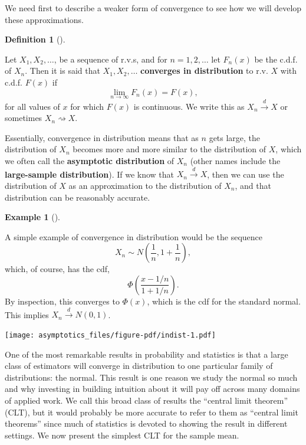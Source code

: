 \documentclass[
  13pt,
  letterpaper,
  DIV=11,
  numbers=noendperiod]{scrreprt}
\newcommand{\indist}{\overset{d}{\to}}
\theoremstyle{plain}
\theoremstyle{definition}
\newtheorem{example}{Example}[chapter]
\theoremstyle{definition}
\newtheorem{definition}{Definition}[chapter]
\theoremstyle{remark}
\begin{document}
We need first to describe a weaker form of convergence to see how we
will develop these approximations.

\begin{definition}[]\protect\hypertarget{def-indist}{}\label{def-indist}

Let \(X_1,X_2,\ldots\), be a sequence of r.v.s, and for
\(n = 1,2, \ldots\) let \(F_n(x)\) be the c.d.f. of \(X_n\). Then it is
said that \(X_1, X_2, \ldots\) \textbf{converges in distribution} to
r.v. \(X\) with c.d.f. \(F(x)\) if \[
\lim_{n\rightarrow \infty} F_n(x) = F(x),
\] for all values of \(x\) for which \(F(x)\) is continuous. We write
this as \(X_n \indist X\) or sometimes \(X_n ⇝ X\).

\end{definition}

Essentially, convergence in distribution means that as \(n\) gets large,
the distribution of \(X_n\) becomes more and more similar to the
distribution of \(X\), which we often call the \textbf{asymptotic
distribution} of \(X_n\) (other names include the \textbf{large-sample
distribution}). If we know that \(X_n \indist X\), then we can use the
distribution of \(X\) as an approximation to the distribution of
\(X_n\), and that distribution can be reasonably accurate.

\begin{example}[]\protect\hypertarget{exm-indist}{}\label{exm-indist}

A simple example of convergence in distribution would be the sequence \[
X_n \sim N\left(\frac{1}{n}, 1 + \frac{1}{n}\right),
\] which, of course, has the cdf, \[
\Phi\left(\frac{x - 1/n}{1+1/n}\right).
\] By inspection, this converges to \(\Phi(x)\), which is the cdf for
the standard normal. This implies \(X_n \indist N(0, 1)\).

\texttt{[image: asymptotics\_files/figure-pdf/indist-1.pdf]}

\end{example}

One of the most remarkable results in probability and statistics is that
a large class of estimators will converge in distribution to one
particular family of distributions: the normal. This result is one
reason we study the normal so much and why investing in building
intuition about it will pay off across many domains of applied work. We
call this broad class of results the ``central limit theorem'' (CLT),
but it would probably be more accurate to refer to them as ``central
limit theorems'' since much of statistics is devoted to showing the
result in different settings. We now present the simplest CLT for the
sample mean.
\end{document}
